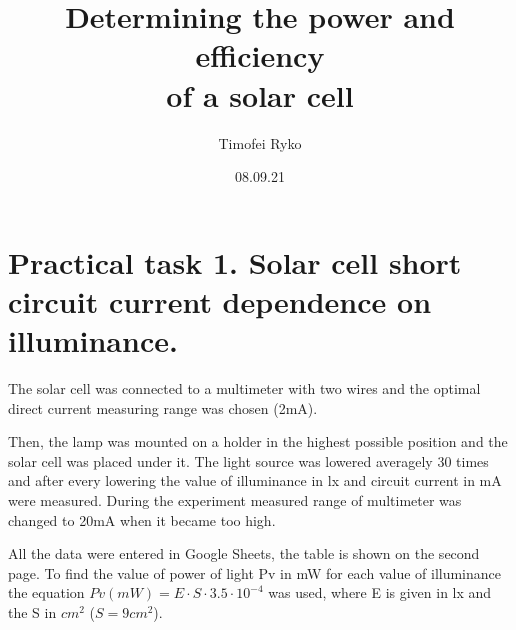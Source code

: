\documentclass[14pt, letterpaper]{article}
\title{Determining the power and efficiency\protect\\ of a solar cell}
\author{Timofei Ryko}
\date{08.09.21}
\begin{document}
\maketitle
\section{Practical task 1. Solar cell short circuit current dependence on illuminance.}
The solar cell was connected to a multimeter with two wires and the optimal direct current measuring range was chosen (2mA).
\par
Then, the lamp was mounted on a holder in the highest possible position and the solar cell was placed under it. The light source was lowered averagely 30 times and after every lowering the value of illuminance in lx and circuit current in mA were measured. During the experiment measured range of multimeter was changed to 20mA when it became too high.
\par
All the data were entered in Google Sheets, the table is shown on the second page. To find the value of power of light Pv in mW for each value of illuminance the equation $Pv (mW) = E \cdot S \cdot 3.5 \cdot 10^{-4}$ was used, where E is given in lx and the S in $cm^2$ ($S = 9cm^2$).


\begin{figure}[h!]
\centering
{}
\end{figure}
\end{document}
